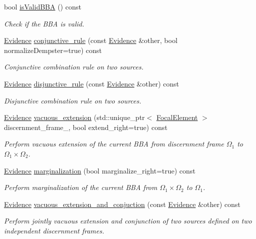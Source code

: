 \begin{DoxyCompactItemize}
bool \hyperlink{classEvidence_aab94dd76c710a6d4be701117a4c52039}{is\+Valid\+B\+BA} () const 
\begin{DoxyCompactList}\small\item\em Check if the B\+BA is valid. \end{DoxyCompactList}\item 
\hyperlink{classEvidence}{Evidence} \hyperlink{classEvidence_a798d5730a20db8baa86ae18a4bd9e23b}{conjunctive\+\_\+rule} (const \hyperlink{classEvidence}{Evidence} \&other, bool normalize\+Dempster=true) const 
\begin{DoxyCompactList}\small\item\em Conjunctive combination rule on two sources. \end{DoxyCompactList}\item 
\hyperlink{classEvidence}{Evidence} \hyperlink{classEvidence_af3739ab4923660f2a4ab00d118595781}{disjunctive\+\_\+rule} (const \hyperlink{classEvidence}{Evidence} \&other) const 
\begin{DoxyCompactList}\small\item\em Disjunctive combination rule on two sources. \end{DoxyCompactList}\item 
\hyperlink{classEvidence}{Evidence} \hyperlink{classEvidence_a20466c8101a61f8a8a716eda3e6b2c4c}{vacuous\+\_\+extension} (std\+::unique\+\_\+ptr$<$ \hyperlink{classFocalElement}{Focal\+Element} $>$ discernment\+\_\+frame\+\_, bool extend\+\_\+right=true) const 
\begin{DoxyCompactList}\small\item\em Perform vacuous extension of the current B\+BA from discernment frame $\Omega_{1}$ to $\Omega_{1} \times \Omega_{2}$. \end{DoxyCompactList}\item 
\hyperlink{classEvidence}{Evidence} \hyperlink{classEvidence_a042d324e0ed4d3e07c87f16b4a1095ca}{marginalization} (bool marginalize\+\_\+right=true) const 
\begin{DoxyCompactList}\small\item\em Perform marginalization of the current B\+BA from $\Omega_{1} \times \Omega_{2}$ to $\Omega_{1}$. \end{DoxyCompactList}\item 
\hyperlink{classEvidence}{Evidence} \hyperlink{classEvidence_a209cebbffe359e12ccdd7743350b3ec3}{vacuous\+\_\+extension\+\_\+and\+\_\+conjuction} (const \hyperlink{classEvidence}{Evidence} \&other) const 
\begin{DoxyCompactList}\small\item\em Perform jointly vacuous extension and conjunction of two sources defined on two independent discernment frames. \end{DoxyCompactList}\item 

\end{DoxyCompactItemize}
